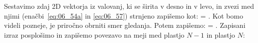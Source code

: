 Sestavimo zdaj 2D vektorja iz valovanj, ki se širita v desno in v levo, in zvezi
med njimi (enačbi~\ref{eq:06_54a} in \ref{eq:06_57}) strnjeno zapišemo kot:
\beq
\left[\begin{array}{c}
E_{2}\\
E_{2}'\\
\end{array}\right] =
\left[\begin{array}{cc}
1& r_{21}\\
r_{21}& 1\\
\end{array}\right]\cdot
{}\!\!.
\label{eq:06_58}
\eeq
Kot bomo videli pozneje, je priročno obrniti smer gledanja. Potem zapišemo:
\beq
{} =
\left[\begin{array}{cc}
1& r_{12}\\
r_{12}& 1\\
\end{array}\right]\cdot
\left[\begin{array}{c}
E_2\\
E_2'\\
\end{array}\right]\!\!.
\label{eq:06_59}
\eeq
Zapisani izraz posplošimo in zapišemo povezavo na meji med plastjo 
$N-1$ in plastjo $N$:


